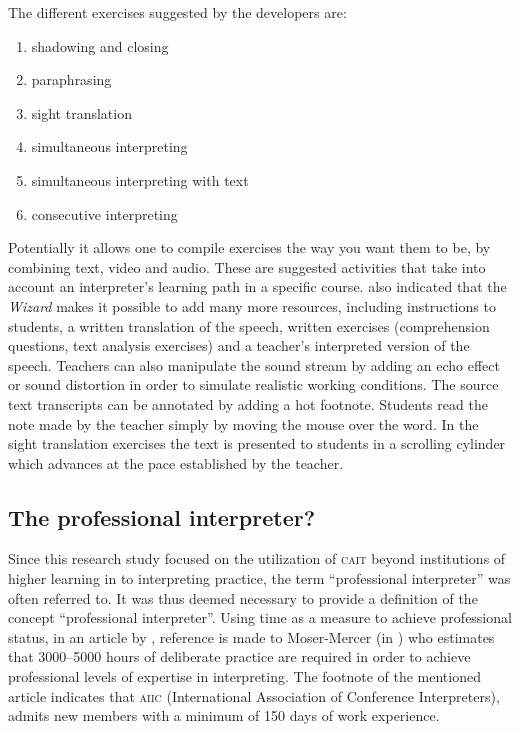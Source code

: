 \documentclass[output=paper]{langsci/langscibook}
\begin{document}
The different exercises suggested by the developers are:

\begin{enumerate}[label=\alph*.]
\item shadowing and closing 
\item paraphrasing 
\item sight translation 
\item simultaneous interpreting 
\item simultaneous interpreting with text 
\item consecutive interpreting 
\end{enumerate}

\noindent Potentially it allows one to compile exercises the way you want them to be, by combining text, video and audio. These are suggested activities that take into account an interpreter’s learning path in a specific course. \citet[10]{Sandrelli2007a} also indicated that the \textit{Wizard} makes it possible to add many more resources, including instructions to students, a written translation of the speech, written exercises (comprehension questions, text analysis exercises) and a teacher’s interpreted version of the speech. Teachers can also manipulate the sound stream by adding an echo effect or sound distortion in order to simulate realistic working conditions. The source text transcripts can be annotated by adding a hot footnote. Students read the note made by the teacher simply by moving the mouse over the word. In the sight translation exercises the text is presented to students in a scrolling cylinder which advances at the pace established by the teacher. 

\subsection{The professional interpreter?}
Since this research study focused on the utilization of \textsc{cait} beyond institutions of higher learning in to interpreting practice, the term “professional interpreter” was often referred to. It was thus deemed necessary to provide a definition of the concept “professional interpreter”. Using time as a measure to achieve professional status, in an article by \citet[115]{Sandrelli2015}, reference is made to Moser-Mercer (in \citealt{Motta2006}) who estimates that 3000--5000 hours of deliberate practice are required in order to achieve professional levels of expertise in interpreting. The footnote of the mentioned article indicates that \textsc{aiic} (International Association of Conference Interpreters), admits new members with a minimum of 150 days of work experience.
\end{document}
